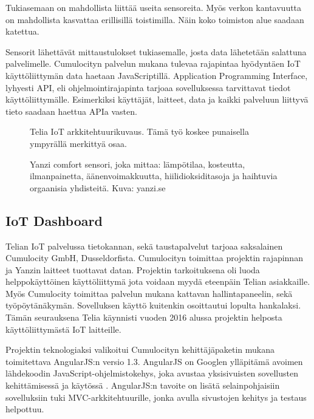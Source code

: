 \documentclass{tktltiki}
\begin{document}
Tukiasemaan on mahdollista liittää useita sensoreita. Myös verkon kantavuutta on mahdollista kasvattaa erillisillä toistimilla. Näin koko toimiston alue saadaan katettua. 

Sensorit lähettävät mittaustulokset tukiasemalle, josta data lähetetään salattuna palvelimelle. Cumulocityn palvelun mukana tulevaa rajapintaa hyödyntäen IoT käyttöliittymän data haetaan JavaScriptillä. Application Programming Interface, lyhyesti API, eli ohjelmointirajapinta tarjoaa sovelluksessa tarvittavat tiedot käyttöliittymälle. Esimerkiksi käyttäjät, laitteet, data ja kaikki palveluun liittyvä tieto saadaan haettua APIa vasten. 

\begin{figure}[h]
\begin{center}
\caption{Telia IoT arkkitehtuurikuvaus. Tämä työ koskee punaisella ympyrällä merkittyä osaa.}
\label{Arkkitehtuurikuvaus}
\end{center}
\end{figure}


\begin{figure}[h]
\begin{center}
\caption{Yanzi comfort sensori, joka mittaa: lämpötilaa, kosteutta, ilmanpainetta, äänenvoimakkuutta, hiilidioksiditasoja ja haihtuvia orgaanisia yhdisteitä. Kuva: yanzi.se}
\label{Yanzi sensori}
\end{center}
\end{figure}
\clearpage

\subsection{IoT Dashboard}

Telian IoT palvelussa tietokannan, sekä taustapalvelut tarjoaa saksalainen Cumulocity GmbH, Dusseldorfista. Cumulocityn toimittaa projektin rajapinnan ja Yanzin laitteet tuottavat datan. Projektin tarkoituksena oli luoda helppokäyttöinen käyttöliittymä jota voidaan myydä eteenpäin Telian asiakkaille. Myös Cumulocity toimittaa palvelun mukana kattavan hallintapaneelin, sekä työpöytänäkymän. Sovelluksen käyttö kuitenkin osoittautui lopulta hankalaksi. Tämän seurauksena Telia käynnisti vuoden 2016 alussa projektin helposta käyttöliittymästä IoT laitteille. 

Projektin teknologiaksi valikoitui Cumulocityn kehittäjäpaketin mukana toimitettava AngularJS:n versio 1.3. AngularJS on Googlen ylläpitämä avoimen lähdekoodin JavaScript-ohjelmistokehys, joka avustaa yksisivuisten sovellusten kehittämisessä ja käytössä \cite{jain2015angularjs}. AngularJS:n tavoite on lisätä selainpohjaisiin sovelluksiin tuki MVC-arkkitehtuurille, jonka avulla sivustojen kehitys ja testaus helpottuu. 
\end{document}
